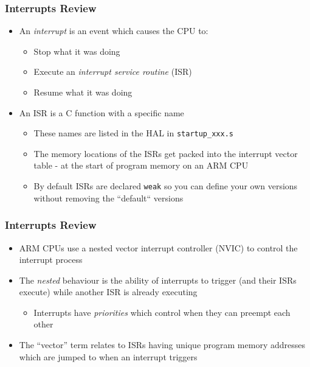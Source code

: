 \documentclass[14pt]{beamer}
\begin{document}
\begin{frame}[fragile]
\frametitle{Interrupts Review}
\begin{itemize}
\item An \textit{interrupt} is an event which causes the CPU to:
\begin{itemize}
\item Stop what it was doing
\item Execute an \textit{interrupt service routine} (ISR)
\item Resume what it was doing
\end{itemize}
\item An ISR is a C function with a specific name
	\begin{itemize}
		\item These names are listed in the HAL in \texttt{startup\_xxx.s}
		\item The memory locations of the ISRs get packed into the interrupt vector table - at the start of program memory on an ARM CPU
		\item By default ISRs are declared \texttt{weak} so you can define your own versions without removing the ``default`` versions
	\end{itemize}
\end{itemize}
\end{frame}

\begin{frame}[fragile]
\frametitle{Interrupts Review}
\begin{itemize}
\item ARM CPUs use a nested vector interrupt controller (NVIC) to control the interrupt process
\item The \textit{nested} behaviour is the ability of interrupts to trigger (and their ISRs execute) while another ISR is already executing
	\begin{itemize}
		\item Interrupts have \textit{priorities} which control when they can preempt each other
	\end{itemize}
\item The ``vector'' term relates to ISRs having unique program memory addresses which are jumped to when an interrupt triggers
\end{itemize}
\end{frame}
\end{document}
